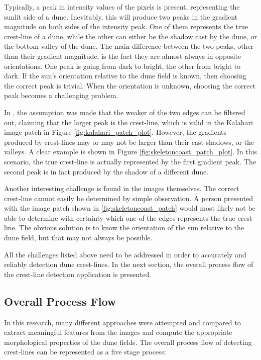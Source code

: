 Typically, a peak in intensity values of the pixels is present, representing the sunlit side of a dune. Inevitably, this will produce two peaks in the gradient magnitude on both sides of the intensity peak. One of them represents the true crest-line of a dune, while the other can either be the shadow cast by the dune, or the bottom valley of the dune. The main difference between the two peaks, other than their gradient magnitude, is the fact they are almost always in opposite orientations. One peak is going from dark to bright, the other from bright to dark. If the sun's orientation relative to the dune field is known, then choosing the correct peak is trivial. When the orientation is unknown, choosing the correct peak becomes a challenging problem. 

In \cite{2015_automated_mapping_of_linear_dunefield}, the assumption was made that the weaker of the two edges can be filtered out, claiming that the larger peak is the crest-line, which is valid in the Kalahari image patch in Figure \ref{fig:kalahari_patch_plot}. However, the gradients produced by crest-lines may or may not be larger than their cast shadows, or the valleys. A clear example is shown in Figure \ref{fig:skeletoncoast_patch_plot}. In this scenario, the true crest-line is actually represented by the first gradient peak. The second peak is in fact produced by the shadow of a different dune.

Another interesting challenge is found in the images themselves. The correct crest-line cannot easily be determined by simple observation. A person presented with the image patch shown in \ref{fig:skeletoncoast_patch} would most likely not be able to determine with certainty which one of the edges represents the true crest-line. The obvious solution is to know the orientation of the sun relative to the dune field, but that may not always be possible.

All the challenges listed above need to be addressed in order to accurately and reliably detection dune crest-lines. In the next section, the overall process flow of the crest-line detection application is presented.

\subsection{Overall Process Flow}

In this research, many different approaches were attempted and compared to extract meaningful features from the images and compute the appropriate morphological properties of the dune fields. The overall process flow of detecting crest-lines can be represented as a five stage process:

